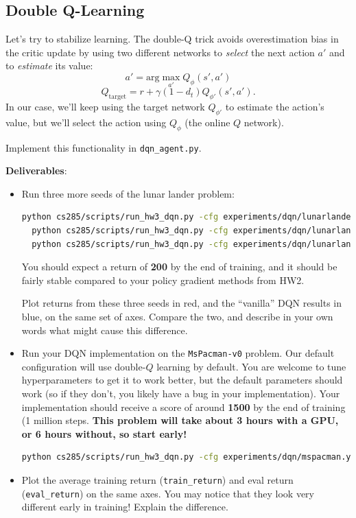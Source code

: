 \subsection{Double Q-Learning}
Let's try to stabilize learning. The double-Q trick avoids overestimation bias in the critic update by using two different networks to \textit{select} the next action $a'$ and to \textit{estimate} its value:
\[a' = \textrm{arg}\max_{a'} Q_{\phi}(s', a')\]
\[Q_{\textrm{target}} = r + \gamma(1-d_t) Q_{\phi'}(s', a').\]
In our case, we'll keep using the target network $Q_{\phi'}$ to estimate the action's value, but we'll select the action using $Q_{\phi}$ (the online $Q$ network).

Implement this functionality in \verb|dqn_agent.py|.

\textbf{Deliverables}:
\begin{itemize}
    \item Run three more seeds of the lunar lander problem:
\begin{lstlisting}[language=bash,breaklines=true]
  python cs285/scripts/run_hw3_dqn.py -cfg experiments/dqn/lunarlander_doubleq.yaml --seed 1
  python cs285/scripts/run_hw3_dqn.py -cfg experiments/dqn/lunarlander_doubleq.yaml --seed 2
  python cs285/scripts/run_hw3_dqn.py -cfg experiments/dqn/lunarlander_doubleq.yaml --seed 3
\end{lstlisting}
    You should expect a return of \textbf{200} by the end of training, and it should be fairly stable compared to your policy gradient methods from HW2.
    
    Plot returns from these three seeds in red, and the ``vanilla'' DQN results in blue, on the same set of axes. Compare the two, and describe in your own words what might cause this difference.

    \item Run your DQN implementation on the \verb|MsPacman-v0| problem. Our default configuration will use double-$Q$ learning by default. You are welcome to tune hyperparameters to get it to work better, but the default parameters should work (so if they don't, you likely have a bug in your implementation). Your implementation should receive a score of around \textbf{1500} by the end of training (1 million steps. \textbf{This problem will take about 3 hours with a GPU, or {\color{red} 6 hours} without, so start early!}
    \begin{lstlisting}[language=bash,breaklines=true]
    python cs285/scripts/run_hw3_dqn.py -cfg experiments/dqn/mspacman.yaml
    \end{lstlisting}
    \item Plot the average training return (\verb|train_return|) and eval return (\verb|eval_return|) on the same axes. You may notice that they look very different early in training! Explain the difference.
\end{itemize}

